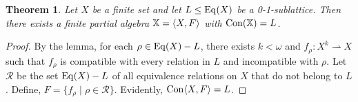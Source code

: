 \documentclass[11pt]{amsart}
\numberwithin{equation}{section}
\theoremstyle{plain}
\newtheorem{theorem}{Theorem}[section]
\theoremstyle{definition}
\begin{document}
\begin{theorem}
Let $X$ be a finite set and let $L\leq \operatorname{Eq}(X)$ be a 0-1-sublattice.
Then there exists a finite partial algebra
$\mathbb X = \langle X, F\rangle$ with $\operatorname{Con}(\mathbb X) =  L$.
\end{theorem}

\begin{proof}
  By the lemma, for each $\rho \in \operatorname{Eq}(X) - L$, there exists $k< \omega$ and
  $f_\rho \colon  X^k \rightharpoonup X$ such that $f_\rho$ is compatible with every relation in
  $L$ and incompatible with $\rho$.  Let $\mathcal{R}$ be the set $\operatorname{Eq}(X) - L$ of
  all equivalence relations on $X$ that do not belong to $L$.  Define,
  $F = \{f_\rho \mid \rho \in \mathcal{R}\}$.  Evidently, $\operatorname{Con} \langle X, F\rangle = L$.
\end{proof}

\printbibliography
\end{document}
